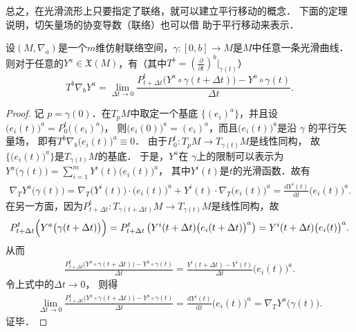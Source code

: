 总之，在光滑流形上只要指定了联络，就可以建立平行移动的概念．
下面的定理说明，切矢量场的协变导数（联络）也可以借 助于平行移动来表示．
\begin{theorem}\label{chccr:thm_parallel-transport}
    设$(M, \nabla_a)$是一个$m$维仿射联络空间，$\gamma:[0, b] \to M$是$M$中任意一条光滑曲线．
    则对于任意的$Y^a \in \mathfrak{X}(M)$，有（其中$T^b=(\frac{\partial}{\partial t})^b|_{\gamma(t)}$）
    \begin{equation}\label{chccr:eqn_parallel-transport}
        T^b\nabla_b Y^a= \lim _{\Delta t \to 0} \frac{P_{t+\Delta t}^t
            \bigl(Y^a \circ \gamma(t+\Delta t)\bigr)-Y^a \circ \gamma(t)}{\Delta t} .
    \end{equation}    
\end{theorem}
\begin{proof}
记 $p=\gamma(0)$．在$T_p M$中取定一个基底 $\{(e_i)^a\}$，并且设
$\bigl(e_i(t)\bigr)^a=P_0^t\bigl((e_i)^a\bigr)$，
则$\bigl(e_i(0)\bigr)^a=(e_i)^a$，而且$\bigl(e_i(t)\bigr)^a$是沿 $\gamma$ 的平行矢量场，
即有$T^b\nabla_b \bigl(e_i(t)\bigr)^a \equiv 0$．
由于$P_0^t: T_p M \rightarrow T_{\gamma(t)} M$是线性同构，
故$\{\bigl(e_i(t)\bigr)^a\}$是$T_{\gamma(t)} M$的基底．
于是，$Y^a$在 $\gamma$上的限制可以表示为$Y^a\bigl(\gamma(t)\bigr)=\sum_{i=1}^m Y^i(t) \bigl(e_i(t)\bigr)^a$，
其中$Y^i(t)$是$t$的光滑函数．故有
\begin{align*}
    \nabla_T Y^a\bigl(\gamma(t)\bigr)= \nabla_T\bigl(Y^i(t)\bigr) \cdot \bigl(e_i(t)\bigr)^a
    +Y^i(t) \cdot \nabla_T \bigl(e_i(t)\bigr)^a
    = \frac{\mathrm{d} Y^i(t)}{\mathrm{d} t}   \bigl(e_i(t)\bigr)^a .
\end{align*}
在另一方面，因为$P_{t+\Delta t}^t: T_{\gamma(t+\Delta t)} M \rightarrow T_{\gamma(t)} M$是线性同构，故
\begin{align*}
    P_{t+\Delta t}^t\Bigl(Y^a\bigl(\gamma(t+\Delta t)\bigr)\Bigr)  
    =P_{t+\Delta t}^t\left(Y^i(t+\Delta t)   \bigl(e_i(t+\Delta t)\bigr)^a \right) 
    =Y^i(t+\Delta t) \bigl(e_i(t) \bigr)^a.
\end{align*}
从而
\begin{align*}
    \frac{P_{t+\Delta t}^t\bigl(Y^a \circ \gamma(t+\Delta t)\bigr)- Y^a \circ \gamma(t)}{\Delta t}
    =\frac{Y^i(t+\Delta t)-Y^i(t)}{\Delta t} \bigl(e_i(t)\bigr)^a .
\end{align*}
令上式中的$\Delta t \rightarrow 0$， 则得
\begin{align*}
    \lim _{\Delta t \to 0} \frac{P_{t+\Delta t}^t\bigl(Y^a \circ \gamma(t+\Delta t)\bigr)-Y^a \circ \gamma(t)}{\Delta t} 
    =\frac{\mathrm{d} Y^i(t)}{\mathrm{d} t} \bigl(e_i(t)\bigr)^a= \nabla_T Y^a\bigl(\gamma(t)\bigr) .
\end{align*}
证毕．
\end{proof}

